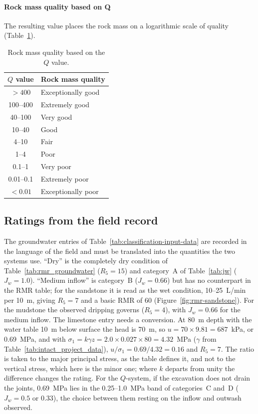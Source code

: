 \paragraph{Rock mass quality based on Q}
The resulting value places the rock mass on a logarithmic scale of quality
(Table~\ref{tab:q_quality}).

\begin{table}[htbp]
\caption{Rock mass quality based on the \(Q\) value.}
\label{tab:q_quality}
\centering
\small
\begin{tabular}{c l}
\toprule
\textbf{\(Q\) value} & \textbf{Rock mass quality} \\
\midrule
\(>400\) & Exceptionally good \\
100--400 & Extremely good \\
40--100 & Very good \\
10--40 & Good \\
4--10 & Fair \\
1--4 & Poor \\
0.1--1 & Very poor \\
0.01--0.1 & Extremely poor \\
\(<0.01\) & Exceptionally poor \\
\bottomrule
\end{tabular}
\end{table}

\subsection{Ratings from the field record}
\label{sec:classification-field-record}

The groundwater entries of Table~\ref{tab:classification-input-data} are
recorded in the language of the field and must be
translated into the quantities the two systems use. ``Dry'' is the completely
dry condition of Table~\ref{tab:rmr_groundwater} (\(R_5 = 15\)) and category~A
of Table~\ref{tab:jw} (\(J_w = 1.0\)). ``Medium inflow'' is category~B
(\(J_w = 0.66\)) but has no counterpart in the RMR table; for the sandstone it
is read as the wet condition, 10--25~L/min per 10~m, giving \(R_5 = 7\) and a
basic RMR of 60 (Figure~\ref{fig:rmr-sandstone}). For
the mudstone the observed dripping governs (\(R_5 = 4\)), with \(J_w = 0.66\)
for the medium inflow. The limestone entry needs a conversion. At 80~m depth
with the water table 10~m below surface the head is 70~m, so
\(u = 70 \times 9.81 = 687\)~kPa, or 0.69~MPa, and with
\(\sigma_1 = k\gamma z = 2.0 \times 0.027 \times 80 = 4.32\)~MPa
(\(\gamma\) from Table~\ref{tab:intact_project_data}),
\(u/\sigma_1 = 0.69/4.32 = 0.16\) and \(R_5 = 7\). The ratio is taken to the
major principal stress, as the table defines it, and not to the vertical
stress, which here is the minor one; where \(k\) departs from unity the
difference changes the rating. For the $Q$-system, if the excavation does not
drain the joints, 0.69~MPa lies in the 0.25--1.0~MPa band of categories~C
and~D (\(J_w = 0.5\) or 0.33), the choice between them
resting on the inflow and outwash observed.

